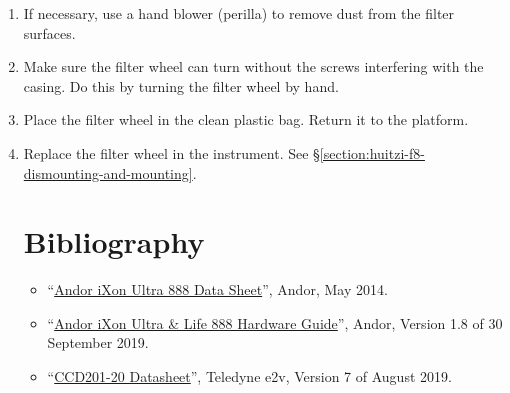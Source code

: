 \begin{enumerate}
    \item If necessary, use a hand blower (perilla) to remove dust from the filter surfaces.
    
    \item Make sure the filter wheel can turn without the screws interfering with the casing. Do this by turning the filter wheel by hand.
    
    \item Place the filter wheel in the clean plastic bag. Return it to the platform.
    
    \item Replace the filter wheel in the instrument. See \S\ref{section:huitzi-f8-dismounting-and-mounting}.

\section{Bibliography}

\begin{flushleft}
\begin{itemize}
\item “\href{bibliography/huitzi/andor-ixon-ultra-888-data-sheet.pdf}{Andor iXon Ultra 888 Data Sheet}”, Andor, May 2014.
\item “\href{bibliography/huitzi/andor-ixon-ultra-888-hardware-guide.pdf}{Andor iXon Ultra \& Life 888 Hardware Guide}”, Andor, Version 1.8 of 30 September 2019.
\item “\href{bibliography/huitzi/e2v-ccd201-20-datasheet.pdf}{CCD201-20 Datasheet}”, Teledyne e2v, Version 7 of August 2019.
\end{itemize}
\end{flushleft}
    
\end{enumerate}